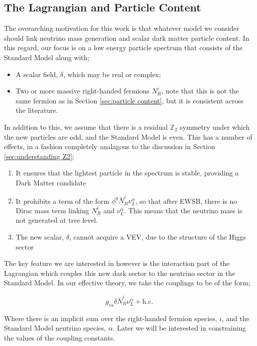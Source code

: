 \documentclass[10pt]{article}
\begin{document}
\subsection{The Lagrangian and Particle Content}
The overarching motivation for this work is that whatever model we consider should link neutrino mass generation and scalar dark matter particle content. In this regard, our focus is on a low energy particle spectrum that consists of the Standard Model along with;
\begin{itemize}
  \item A scalar field, $\delta$, which may be real or complex;
  \item Two or more massive right-handed fermions $N^i_R$, note that this is not the same fermion as in Section \ref{sec:particle content}, but it is consistent across the literature.
\end{itemize}
In addition to this, we assume that there is a residual $\mathbb{Z}_2$ symmetry under which the new particles are odd, and the Standard Model is even. This has a number of effects, in a fashion completely analagous to the discussion in Section \ref{sec:understanding Z2};
\begin{enumerate}
  \item It ensures that the lightest particle in the spectrum is stable, providing a Dark Matter candidate
  \item It prohibits a term of the form $\phi^0 \bar{N}_R^i \nu^\alpha_L$, so that after EWSB, there is no Dirac mass term linking $N^i_R$ and $\nu^\alpha_L$. This means that the neutrino mass is not generated at tree level.
  \item The new scalar, $\delta$, cannot acquire a VEV, due to the structure of the Higgs sector
\end{enumerate}
The key feature we are interested in however is the interaction part of the Lagrangian which couples this new dark sector to the neutrino sector in the Standard Model. In our effective theory, we take the couplings to be of the form;
\begin{framed}
\begin{equation}\label{eq:effective lagrangian}
  g_{i\alpha}\delta \bar{N}^i_R \nu^\alpha_L + \text{h.c.}
\end{equation}
\end{framed}
\noindent Where there is an implicit sum over the right-handed fermion species, $i$, and the Standard Model neutrino species, $\alpha$. Later we will be interested in constraining the values of the coupling constants.
\end{document}
